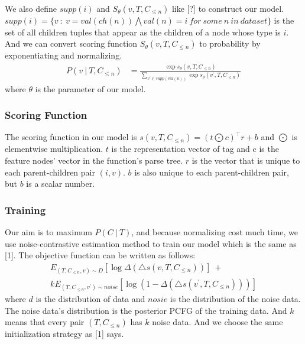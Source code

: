 We also define $supp(i)$ and $S_{\theta}(v,T,C_{\leq n})$ like [?] to construct our model. $supp(i) = \{v\ :\ v=val(ch(n)) \bigwedge val(n)=i\ for\ some\ n\ in\ dataset\}$ is the set of all children tuples that appear as the children of a node whose type is $i$. And we can convert scoring function $S_{\theta}(v,T,C_{\leq n})$ to probability by exponentiating and normalizing.
\begin{align}
    P(v\ |\ T,C_{\leq n}) & = \frac{\exp s_{\theta}(v,T,C_{\leq n})}{\sum_{v^{'}\in supp(val(n))}\exp s_{\theta}(v^{'},T,C_{\leq n})}
\end{align}
where $\theta$ is the parameter of our model.
\subsubsection{Scoring Function}
The scoring function in our model is $s(v,T,C_{\leq n}) = (t \bigodot c)^{\top} r + b$ and $\bigodot$ is elementwise multiplication. $t$ is the representation vector of tag and c is the feature nodes' vector in the function's parse tree. $r$ is the vector that is unique to each parent-children pair $(i,v)$. $b$ is also unique to each parent-children pair, but $b$ is a scalar number.
\subsubsection{Training}
Our aim is to maximum $P(C\ |\ T)$, and because normalizing cost much time, we use noise-contrastive estimation method to train our model which is the same as [1]. The objective function can be written as follows:
\begin{align}
  \nonumber  E_{(T,C_{\leq n},v)\sim D}[\log\Delta(\triangle s(v,T,C_{\leq n}))]\ +\ \\ kE_{(T,C_{\leq n},v^{'})\sim noise}[\log(1-\Delta(\triangle s(v^{'},T,C_{\leq n})))]
\end{align}
where $d$ is the distribution of data and $nosie$ is the distribution of the noise data. The noise data's distribution is the posterior PCFG of the training data. And $k$ means that every pair $(T,C_{\leq n})$ has $k$ noise data. And we choose the same initialization strategy as [1] says.
